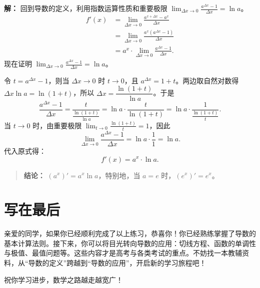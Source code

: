 \documentclass[10pt]{article}
\begin{document}
\begin{enumerate}[label=\arabic*., resume]
    \textbf{解：} 回到导数的定义，利用指数运算性质和重要极限 $\displaystyle\lim_{\Delta x \to 0}\frac{a^{\Delta x} - 1}{\Delta x} = \ln a$。
    \begin{align*}
        f'(x) &= \lim_{\Delta x \to 0} \frac{a^{x+\Delta x} - a^x}{\Delta x} \\
        &= \lim_{\Delta x \to 0} \frac{a^x (a^{\Delta x} - 1)}{\Delta x} \\
        &= a^x \cdot \lim_{\Delta x \to 0} \frac{a^{\Delta x} - 1}{\Delta x}.
    \end{align*}
    现在证明 $\displaystyle\lim_{\Delta x \to 0} \frac{a^{\Delta x} - 1}{\Delta x} = \ln a$。
    
    令 $t = a^{\Delta x} - 1$，则当 $\Delta x \to 0$ 时 $t \to 0$，且 $a^{\Delta x} = 1 + t$。两边取自然对数得 $\Delta x \ln a = \ln(1+t)$，所以 $\Delta x = \dfrac{\ln(1+t)}{\ln a}$。于是
    $$\frac{a^{\Delta x} - 1}{\Delta x} = \frac{t}{\frac{\ln(1+t)}{\ln a}} = \ln a \cdot \frac{t}{\ln(1+t)} = \ln a \cdot \frac{1}{\frac{\ln(1+t)}{t}}.$$
    当 $t \to 0$ 时，由重要极限 $\displaystyle\lim_{t \to 0}\frac{\ln(1+t)}{t} = 1$，因此
    $$\lim_{\Delta x \to 0} \frac{a^{\Delta x} - 1}{\Delta x} = \ln a \cdot \frac{1}{1} = \ln a.$$
    代入原式得：
    $$f'(x) = a^x \cdot \ln a.$$
    \begin{quote}
        \textbf{结论：} $(a^x)' = a^x \ln a$，特别地，当 $a=e$ 时，$(e^x)' = e^x$。
    \end{quote}
\end{enumerate}

\section*{写在最后}
亲爱的同学，如果你已经顺利完成了以上练习，恭喜你！你已经熟练掌握了导数的基本计算法则。接下来，你可以将目光转向导数的应用：切线方程、函数的单调性与极值、最值问题等。这些内容才是高考与各类考试的重点。不妨找一本教辅资料，从“导数的定义”跨越到“导数的应用”，开启新的学习旅程吧！

祝你学习进步，数学之路越走越宽广！
\end{document}
